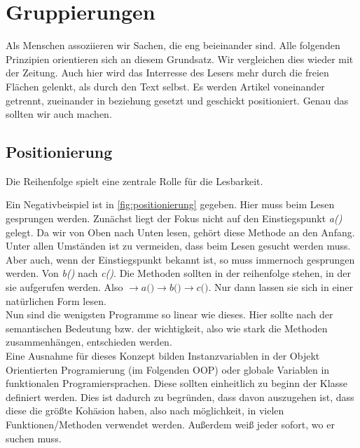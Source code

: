 \section{Gruppierungen}
    Als Menschen assoziieren wir Sachen, die eng beieinander sind.
    Alle folgenden Prinzipien orientieren sich an diesem Grundsatz.
    Wir vergleichen dies wieder mit der Zeitung.
    Auch hier wird das Interresse des Lesers mehr durch die freien Flächen gelenkt, als durch den Text selbst.
    Es werden Artikel voneinander getrennt, zueinander in beziehung gesetzt und geschickt positioniert.
    Genau das sollten wir auch machen.

    \subsection{Positionierung}
        Die Reihenfolge spielt eine zentrale Rolle für die Lesbarkeit.
        
        Ein Negativbeispiel ist in \ref{fig:positionierung} gegeben.
        Hier muss beim Lesen gesprungen werden.
        Zunächst liegt der Fokus nicht auf den Einstiegspunkt \textit{a()} gelegt.
        Da wir von Oben nach Unten lesen, gehört diese Methode an den Anfang.
        Unter allen Umständen ist zu vermeiden, dass beim Lesen gesucht werden muss.\\
        Aber auch, wenn der Einstiegspunkt bekannt ist, so muss immernoch gesprungen werden.
        Von \textit{b()} nach \textit{c()}.
        Die Methoden sollten in der reihenfolge stehen, in der sie aufgerufen werden.
        Also $\rightarrow\textit{a()}\rightarrow\textit{b()}\rightarrow\textit{c()}$.
        Nur dann lassen sie sich in einer natürlichen Form lesen.\\
        Nun sind die wenigsten Programme so linear wie dieses.
        Hier sollte nach der semantischen Bedeutung bzw. der wichtigkeit, also wie stark die Methoden zusammenhängen, entschieden werden.\\
        Eine Ausnahme für dieses Konzept bilden Instanzvariablen in der Objekt Orientierten Programierung (im Folgenden OOP) oder globale Variablen in funktionalen Programiersprachen.
        Diese sollten einheitlich zu beginn der Klasse definiert werden.
        Dies ist dadurch zu begründen, dass davon auszugehen ist, dass diese die größte Kohäsion haben, also nach möglichkeit, in vielen Funktionen/Methoden verwendet werden.
        Außerdem weiß jeder sofort, wo er suchen muss.\\
